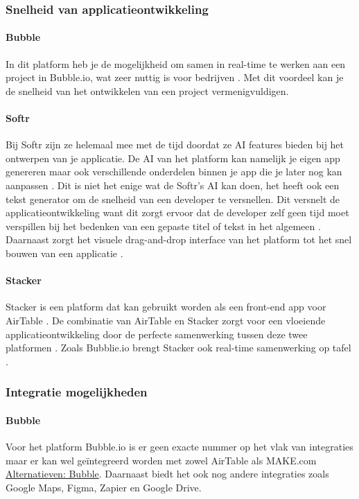 \subsubsection*{Snelheid van applicatieontwikkeling}
\paragraph{Bubble}
In dit platform heb je de mogelijkheid om samen in real-time te werken aan een project in Bubble.io, wat zeer nuttig is voor bedrijven \autocite{Bubble2024b}. 
Met dit voordeel kan je de snelheid van het ontwikkelen van een project vermenigvuldigen.
\paragraph{Softr}
Bij Softr zijn ze helemaal mee met de tijd doordat ze AI features bieden bij het ontwerpen van je applicatie. 
De AI van het platform kan namelijk je eigen app genereren maar ook verschillende onderdelen binnen je app 
die je later nog kan aanpassen \autocite{Frater2024}. Dit is niet het enige wat de Softr’s 
AI kan doen, het heeft ook een tekst generator om de snelheid van een developer te versnellen. 
Dit versnelt de applicatieontwikkeling want dit zorgt ervoor dat de developer zelf geen 
tijd moet verspillen bij het bedenken van een gepaste titel of tekst in het algemeen \autocite{Frater2024}. 
Daarnaast zorgt het visuele drag-and-drop interface van het platform tot het snel bouwen van een applicatie \autocite{Code2023}. 
\paragraph{Stacker}
Stacker is een platform dat kan gebruikt worden als een front-end app voor AirTable \autocite{Advice}. 
De combinatie van AirTable en Stacker zorgt voor een vloeiende applicatieontwikkeling door de perfecte samenwerking tussen deze twee platformen \autocite{Advice}. 
Zoals Bubblie.io brengt Stacker ook real-time samenwerking op tafel \autocite{Allen2020}.
\subsubsection*{Integratie mogelijkheden}
\paragraph{Bubble}
Voor het platform Bubble.io is er geen exacte nummer op het vlak van integraties maar er kan wel geïntegreerd worden met zowel AirTable als MAKE.com \hyperref[subsec:alternatieve-platformen]{Alternatieven: Bubble}. 
Daarnaast biedt het ook nog andere integraties zoals Google Maps, Figma, Zapier en Google Drive.
